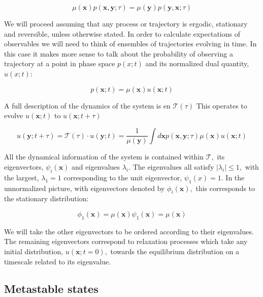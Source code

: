 \begin{equation}
\mu(\mathbf{x}) p(\mathbf{x}, \mathbf{y} ; \tau)=\mu(\mathbf{y}) p(\mathbf{y}, \mathbf{x} ; \tau)
\end{equation}

We will proceed assuming that any process or trajectory is ergodic, stationary and reversible, unless otherwise stated. In order to calculate expectations of observables we will need to think of ensembles of trajectories evolving in time. In this case it makes more sense to talk about the probability of observing a trajectory at a point in phase space $p(x;t)$ and its normalized dual quantity, $u(x;t)$: 

\begin{equation}
p(\mathbf{x} ; t)=\mu(\mathbf{x}) u(\mathbf{x} ; t)
\end{equation}

A full description of the dynamics of the system is en $\mathcal{T}(\tau)$ This operates to evolve $u(\mathbf{x} ; t)$ to $u(\mathbf{x} ; t+\tau)$

\begin{equation}
u(\mathbf{y} ; t+\tau)=\mathcal{T}(\tau) \cdot u(\mathbf{y} ; t)=\frac{1}{\mu(\mathbf{y})} \int d \mathbf{x} p(\mathbf{x}, \mathbf{y} ; \tau) \mu(\mathbf{x}) u(\mathbf{x} ; t)
\end{equation}

All the dynamical information of the system is contained within $\mathcal{T},$ its eigenvectors, $\psi_{i}(\mathbf{x})$ and eigenvalues $\lambda_{i} .$ The eigenvalues all satisfy $\left|\lambda_{i}\right| \leq 1,$ with the largest, $\lambda_{1}=1$ corresponding to the unit eigenvector, $\psi_{1}(x)=1 .$ In the unnormalized picture, with eigenvectors denoted by $\phi_{i}(\mathbf{x}),$ this corresponds to the stationary distribution:

\begin{equation}
\phi_{1}(\mathbf{x})=\mu(\mathbf{x}) \psi_{1}(\mathbf{x})=\mu(\mathbf{x})
\end{equation}

We will take the other eigenvectors to be ordered according to their eigenvalues. The remaining eigenvectors correspond to relaxation processes which take any initial distribution, $u(\mathbf{x} ; t=0),$ towards the equilibrium distribution on a timescale related to its eigenvalue.

\subsection{Metastable states}

